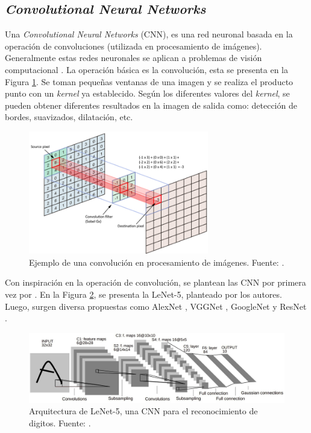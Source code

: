 \subsection{\textit{Convolutional Neural Networks}}

Una \textit{Convolutional Neural Networks} (CNN), es una red neuronal basada en la operación de convoluciones (utilizada en procesamiento de imágenes). Generalmente estas redes neuronales se aplican a problemas de visión computacional \citep{zhang2021dive}. La operación básica es la convolución, esta se presenta en la Figura \ref{fig:cnn}. Se toman pequeñas ventanas de una imagen y se realiza el producto punto con un \textit{kernel} ya establecido. Según los diferentes valores del \textit{kernel}, se pueden obtener diferentes resultados en la imagen de salida como: detección de bordes, suavizados, dilatación, etc.


\begin{figure}[H]
	\centering
	\includegraphics[width=0.7\textwidth]{img/neoantigen/cnn}
	\caption{Ejemplo de una convolución en procesamiento de imágenes. Fuente: \cite{Shuchen2022}.}
	\label{fig:cnn}
\end{figure}

Con inspiración en la operación de convolución, se plantean las CNN por primera vez por \cite{lecun1998gradient}. En la Figura \ref{fig:cnn3}, se presenta la LeNet-5, planteado por los autores. Luego, surgen diversa propuestas como AlexNet \citep{krizhevsky2012imagenet}, VGGNet \citep{simonyan2014very}, GoogleNet \citep{szegedy2015going} y ResNet \citep{he2016deep}.

\begin{figure}[H]
	\centering
	\includegraphics[width=\textwidth]{img/neoantigen/cnn3}
	\caption{Arquitectura de LeNet-5, una CNN para el reconocimiento de digitos. Fuente: \cite{lecun1998gradient}.}
	\label{fig:cnn3}
\end{figure}


